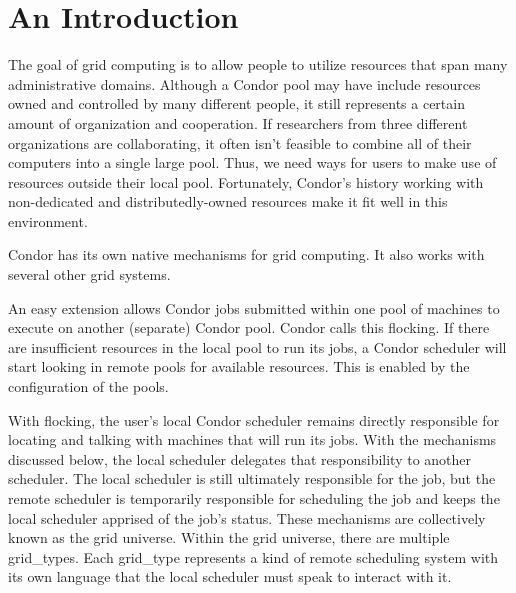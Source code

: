 \section{\label{sec:grids-intro}An Introduction}

The goal of grid computing is to allow people to utilize resources that
span many administrative domains. Although a Condor pool may have include
resources owned and controlled by many different people, it still
represents a certain amount of organization and cooperation. If 
researchers from three different organizations are collaborating, it often
isn't feasible to combine all of their computers into a single large pool.
Thus, we need ways for users to make use of resources outside their local
pool. Fortunately, Condor's history working with non-dedicated and
distributedly-owned resources make it fit well in this environment.

Condor has its own native mechanisms for grid computing. It also works
with several other grid systems.


An easy extension allows Condor jobs submitted within one pool
of machines to execute on another (separate) Condor pool.
Condor calls this flocking.
If there are insufficient resources in the local pool to run its jobs,
a Condor scheduler will start looking in remote pools for available
resources.
This is enabled by the configuration of the pools.

With flocking, the user's local Condor scheduler remains directly
responsible for locating and talking with machines that will run its
jobs. With the mechanisms discussed below, the local scheduler delegates
that responsibility to another scheduler. The local scheduler is still
ultimately responsible for the job, but the remote scheduler is 
temporarily responsible for scheduling the job and keeps the local
scheduler apprised of the job's status. These mechanisms are
collectively known as the grid universe. Within the grid universe, there
are multiple grid\_types. Each grid\_type represents a kind of remote
scheduling system with its own language that the local scheduler must
speak to interact with it.

